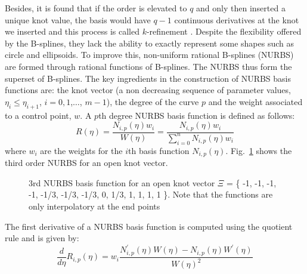 Besides, it is found that if the order is elevated to $q$ and only then inserted a unique knot value, the basis would have $q-1$ continuous derivatives at the knot we inserted and this process is called $k$-refinement \citep{Hug2005b}.
Despite the flexibility offered by the B-splines, they lack the ability to exactly represent some shapes such as circle and ellipsoids.
To improve this, non-uniform rational B-splines (NURBS) are formed through rational functions of B-splines.
The NURBS thus form the superset of B-splines.
The key ingredients in the construction of NURBS basis functions are: the knot vector (a non decreasing sequence of parameter values, $\eta_i \leq \eta_{i+1}$, $i=0,1$,$\dots$, $m-1$), the degree of the curve $p$ and the weight associated to a control point, $w$.
A $p$th degree NURBS basis function is defined as follows:
\begin{equation}
    R(\eta) =   \frac{ N_{i,p}(\eta) w_i }{W(\eta)}
            =   \frac{ N_{i,p}(\eta) w_i }{
                    \sum_{i=0}^{n} N_{i,p}(\eta)w_i
                }
\label{iso_eq:rational_basis_function}
\end{equation}
where $w_i$ are the weights for the $i$th basis function $N_{i,p}(\eta)$.
Fig.~\ref{lr_fig:nurbs_rational_basis} shows the third order NURBS for an open knot vector.

\begin{figure}
    \centering
    \caption[3rd NURBS basis function]{
        3rd NURBS basis function for an open knot vector $\Xi$ = \{ -1, -1, -1, -1, -1/3, -1/3, -1/3, 0, 1/3, 1, 1, 1, 1 \}.
        Note that the functions are only interpolatory at the end points
    }
    \label{lr_fig:nurbs_rational_basis}
\end{figure}

The first derivative of a NURBS basis function is computed using the quotient rule and is given by:
\begin{equation}
    \frac{d}{d\eta}R_{i,p}(\eta) =  w_i\frac{
        N^\prime_{i,p}(\eta)W(\eta) - N_{i,p}(\eta) W^\prime(\eta)
    }{W(\eta)^2}
\end{equation}